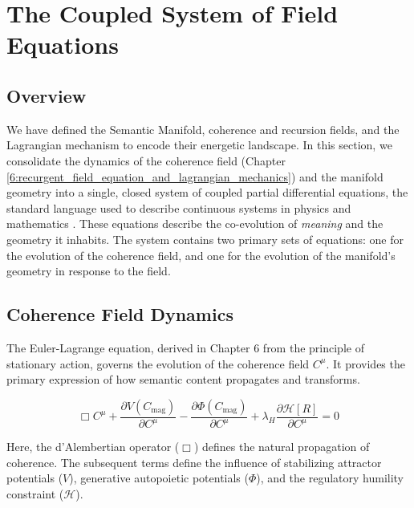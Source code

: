 \chapter{The Coupled System of Field Equations}
\label{10:the_coupled_system_of_field_equations}


\section{Overview}
\label{10.1:overview}

We have defined the Semantic Manifold, coherence and recursion fields, and the Lagrangian mechanism to encode their energetic landscape. In this section, we consolidate the dynamics of the coherence field (Chapter \ref{6:recurgent_field_equation_and_lagrangian_mechanics}) and the manifold geometry into a single, closed system of coupled partial differential equations, the standard language used to describe continuous systems in physics and mathematics \autocite{Evans2010}. These equations describe the co-evolution of \textit{meaning} and the geometry it inhabits. The system contains two primary sets of equations: one for the evolution of the coherence field, and one for the evolution of the manifold's geometry in response to the field.


\section{Coherence Field Dynamics}
\label{10.2:coherence_field_dynamics}

The Euler-Lagrange equation, derived in Chapter 6 from the principle of stationary action, governs the evolution of the coherence field \(C^\mu\). It provides the primary expression of how semantic content propagates and transforms.

\begin{equation}
\Box C^\mu + \frac{\partial V(C_{\mathrm{mag}})}{\partial C^\mu} - \frac{\partial \Phi(C_{\mathrm{mag}})}{\partial C^\mu} + \lambda_H \frac{\partial \mathcal{H}[R]}{\partial C^\mu} = 0
\end{equation}

Here, the d'Alembertian operator (\(\Box\)) defines the natural propagation of coherence. The subsequent terms define the influence of stabilizing attractor potentials (\(V\)), generative autopoietic potentials (\(\Phi\)), and the regulatory humility constraint (\(\mathcal{H}\)).

